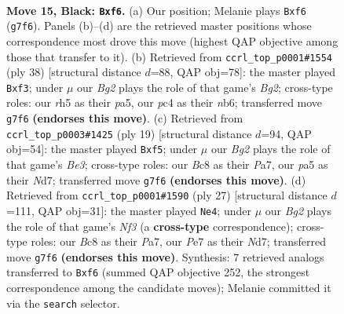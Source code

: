 \documentclass[11pt]{article}
\begin{document}
\clearpage

\begin{figure}[p]\centering
\begin{subfigure}{0.46\textwidth}\centering
\resizebox{\linewidth}{!}{%
\newchessgame
\chessboard[
  setfen={rnbr2k1/pppnp1bp/5P2/P6R/2P5/1B3N2/1P3PP1/RNB1K3 b Q - 0 15},
  showmover=false,
  pgfstyle=straightmove, color=movearrow, markmove={g7-f6}
]}
\caption{}
\end{subfigure}\hfill
\begin{subfigure}{0.46\textwidth}\centering
\resizebox{\linewidth}{!}{%
\newchessgame
\chessboard[
  setfen={r3k2r/1pb2p1p/1np1p3/p3Pb2/8/2B2pP1/PP1NP1BP/2RR2K1 w kq - 0 20},
  showmover=false,
  pgfstyle=straightmove, color=movearrow, markmove={g2-f3}
]}
\caption{}
\end{subfigure}
\\[4pt]
\begin{subfigure}{0.46\textwidth}\centering
\resizebox{\linewidth}{!}{%
\newchessgame
\chessboard[
  setfen={2kr1bnr/pp1np2p/2p1b1p1/5P2/P7/3NB3/1PP2PPP/RN1K1B1R b - - 0 10},
  showmover=false,
  pgfstyle=straightmove, color=movearrow, markmove={e6-f5}
]}
\caption{}
\end{subfigure}\hfill
\begin{subfigure}{0.46\textwidth}\centering
\resizebox{\linewidth}{!}{%
\newchessgame
\chessboard[
  setfen={r2k3r/pppn4/4pnpp/4P3/2P2B2/2P5/P3B1PP/R3K2R b KQ - 0 14},
  showmover=false,
  pgfstyle=straightmove, color=movearrow, markmove={f6-e4}
]}
\caption{}
\end{subfigure}
\caption{\textbf{Move 15, Black: \texttt{Bxf6}.} (a) Our position; Melanie plays \texttt{Bxf6} (\texttt{g7f6}). Panels (b)--(d) are the retrieved master positions whose correspondence most drove this move (highest QAP objective among those that transfer to it). (b) Retrieved from \texttt{ccrl\_top\_p0001\#1554} (ply 38) [structural distance $d$=88, QAP obj=78]: the master played \texttt{Bxf3}; under $\mu$ our \emph{Bg2} plays the role of that game's \emph{Bg2}; cross-type roles: our \emph{r}h5 as their \emph{p}a5, our \emph{p}c4 as their \emph{n}b6; transferred move \texttt{g7f6} \textbf{(endorses this move)}. (c) Retrieved from \texttt{ccrl\_top\_p0003\#1425} (ply 19) [structural distance $d$=94, QAP obj=54]: the master played \texttt{Bxf5}; under $\mu$ our \emph{Bg2} plays the role of that game's \emph{Be3}; cross-type roles: our \emph{B}c8 as their \emph{P}a7, our \emph{p}a5 as their \emph{N}d7; transferred move \texttt{g7f6} \textbf{(endorses this move)}. (d) Retrieved from \texttt{ccrl\_top\_p0001\#1590} (ply 27) [structural distance $d$=111, QAP obj=31]: the master played \texttt{Ne4}; under $\mu$ our \emph{Bg2} plays the role of that game's \emph{Nf3} (a \textbf{cross-type} correspondence); cross-type roles: our \emph{B}c8 as their \emph{P}a7, our \emph{P}e7 as their \emph{N}d7; transferred move \texttt{g7f6} \textbf{(endorses this move)}. Synthesis: 7 retrieved analogs transferred to \texttt{Bxf6} (summed QAP objective 252, the strongest correspondence among the candidate moves); Melanie committed it via the \texttt{search} selector.}
\label{fig:thought-m29}
\end{figure}
\end{document}
